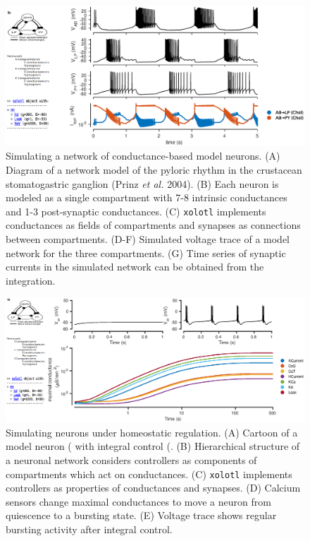 \documentclass{frontiersSCNS} %
\begin{document}
\begin{figure}
	\centering
	\includegraphics[width=1.0\linewidth]{gfx/figure_network}
	\caption{Simulating a network of conductance-based model neurons. (A) Diagram of a network model of the pyloric rhythm in the crustacean stomatogastric ganglion (Prinz \textit{et al.} 2004). (B) Each neuron is modeled as a single compartment with 7-8 intrinsic conductances and 1-3 post-synaptic conductances. (C) \texttt{xolotl} implements conductances as fields of compartments and synapses as connections between compartments. (D-F) Simulated voltage trace of a model network for the three compartments. (G) Time series of synaptic currents in the simulated network can be obtained from the integration.}
	\label{fig:figurenetwork}
\end{figure}

\begin{figure}
	\centering
	\includegraphics[width=1.0\linewidth]{gfx/figure_integral_control}
	\caption{Simulating neurons under homeostatic regulation. (A) Cartoon of a model neuron (\cite{liuModelNeuronActivitydependent1998} with integral control (\cite{olearyCorrelationsIonChannel2013}. (B) Hierarchical structure of a neuronal network considers controllers as components of compartments which act on conductances. (C) \texttt{xolotl} implements controllers as properties of conductances and synapses. (D) Calcium sensors change maximal conductances to move a neuron from quiescence to a bursting state. (E) Voltage trace shows regular bursting activity after integral control.}
	\label{fig:figureintegralcontrol}
\end{figure}
\end{document}
